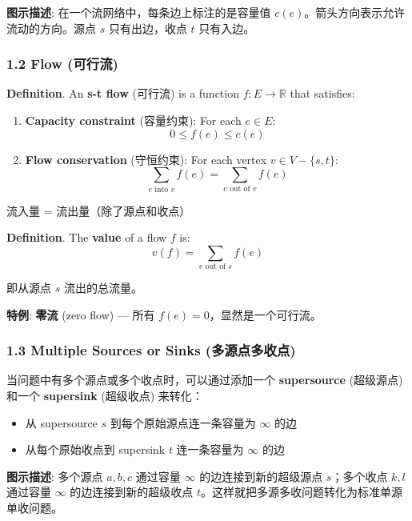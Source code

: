 \documentclass[10pt,a4paper,openany]{ctexbook}
\theoremstyle{definition}
\theoremstyle{remark}
\renewenvironment{quote}
  {\list{}{\leftmargin=1em\rightmargin=0pt\topsep=0.5pt\partopsep=0pt}\item[]}
  {\endlist}
\begin{document}
\begin{quote}
\textbf{图示描述}: 在一个流网络中，每条边上标注的是容量值 $c(e)$。箭头方向表示允许流动的方向。源点 $s$ 只有出边，收点 $t$ 只有入边。

\end{quote}

\subsubsection{1.2 Flow (可行流)}

\textbf{Definition}. An \textbf{s-t flow} (可行流) is a function $f: E \to \mathbb{R}$ that satisfies:
\begin{enumerate}
\item \textbf{Capacity constraint} (容量约束): For each $e \in E$:
\[
0 \le f(e) \le c(e)
\]


\item \textbf{Flow conservation} (守恒约束): For each vertex $v \in V - \{s, t\}$:
\[
\sum_{e \text{ into } v} f(e) = \sum_{e \text{ out of } v} f(e)
\]

\end{enumerate}

\begin{quote}
流入量 = 流出量（除了源点和收点）

\textbf{Definition}. The \textbf{value} of a flow $f$ is:
\[
v(f) = \sum_{e \text{ out of } s} f(e)
\]


即从源点 $s$ 流出的总流量。

\textbf{特例}: \textbf{零流} (zero flow) — 所有 $f(e) = 0$，显然是一个可行流。

\end{quote}

\subsubsection{1.3 Multiple Sources or Sinks (多源点多收点)}

当问题中有多个源点或多个收点时，可以通过添加一个 \textbf{supersource} (超级源点) 和一个 \textbf{supersink} (超级收点) 来转化：
\begin{itemize}
\item 从 supersource $s$ 到每个原始源点连一条容量为 $\infty$ 的边
\item 从每个原始收点到 supersink $t$ 连一条容量为 $\infty$ 的边

\end{itemize}

\begin{quote}
\textbf{图示描述}: 多个源点 $a, b, c$ 通过容量 $\infty$ 的边连接到新的超级源点 $s$；多个收点 $k, l$ 通过容量 $\infty$ 的边连接到新的超级收点 $t$。这样就把多源多收问题转化为标准单源单收问题。

\end{quote}
\vspace{-2pt}
\end{document}
